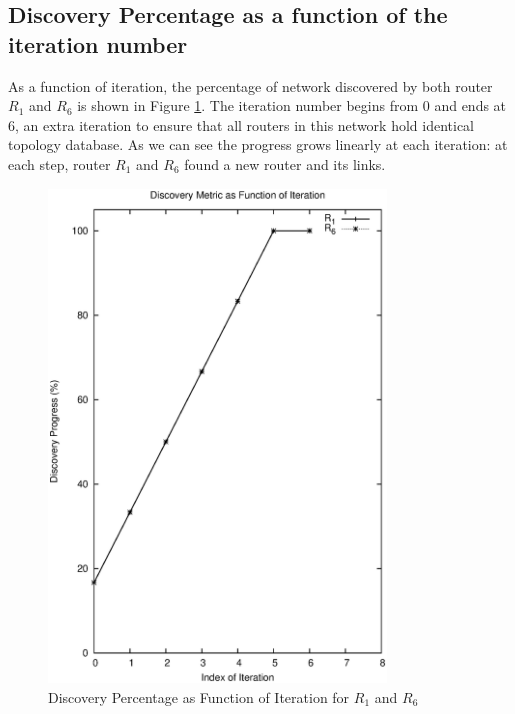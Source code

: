 \documentclass[12pt]{article}  %
\theoremstyle{definition}
\theoremstyle{remark}
\begin{document}
\subsection{Discovery Percentage as a function of the iteration number}
As a function of iteration, the percentage of network discovered by both router $R_1$ and $R_6$ is shown in Figure \ref{fig:progress}.
The iteration number begins from 0 and ends at 6, an extra iteration to ensure that all routers in this network hold identical topology database.
As we can see the progress grows linearly at each iteration: at each step, router $R_1$ and $R_6$ found a new router and its links.

\begin{figure}[h]
\centering
        \includegraphics[width=0.8\textwidth, height=0.8\textheight]{progress.ps}
\caption{Discovery Percentage as Function of Iteration for $R_1$ and $R_6$}
\label{fig:progress}
\end{figure}


%
%
%
\end{document}
